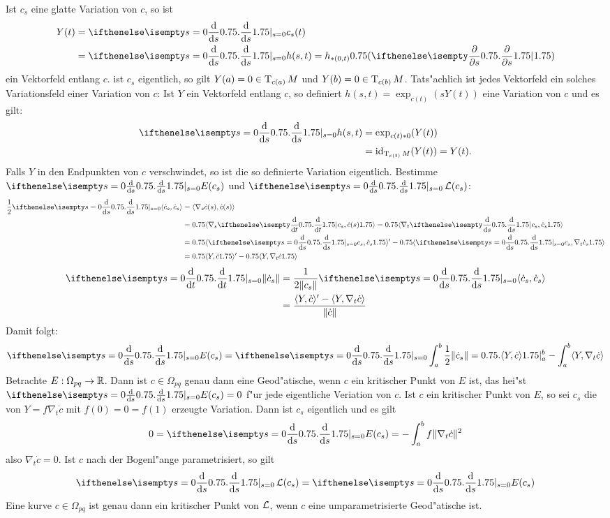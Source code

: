 Ist $c_s$ eine glatte Variation von $c$, so ist
\begin{align*}
	Y(t) &= \difffrac[s=0]{}{s} c_s(t)\\
	&= \difffrac[s=0]{}{s} h(s,t) = h_{*(0,t)}\left(\pdifffrac{}{s}\right)
\end{align*}
ein Vektorfeld entlang $c$. ist $c_s$ eigentlich, so gilt $Y(a) = 0 \in \operatorname{T}_{c(a)}M$ und $Y(b) = 0 \in \operatorname{T}_{c(b)}M$.
Tats"achlich ist jedes Vektorfeld ein solches Variationsfeld einer Variation von $c$: Ist $Y$ ein Vektorfeld entlang $c$, so definiert $h(s,t) = \exp_{c(t)}(s Y(t))$ eine Variation von $c$ und es gilt:
\begin{align*}
	\difffrac[s=0]{}{s} h(s,t) &= \exp_{c(t)*0}(Y(t))\\
	&= \id_{\T_{c(t)}M}(Y(t)) = Y(t).
\end{align*}
Falls $Y$ in den Endpunkten von $c$ verschwindet, so ist die so definierte Variation eigentlich. Bestimme $\difffrac[s=0]{}{s} E(c_s)$ und $\difffrac[s=0]{}{s}\calL(c_s)$:
\begin{align*}
	\frac{1}{2} \difffrac[s=0]{}{s} \langle \dot c_s, \dot c_s \rangle &= \langle \nabla_s \dot c(s), \dot c(s) \rangle\\
		&= \left\langle \nabla_s \difffrac{}{t} c_s, \dot c(s) \right\rangle = \left\langle \nabla_t \difffrac{}{s} c_s, \dot c_s \right\rangle \\
		&= \left\langle \difffrac[s=0]{}{s} c_s, \dot c_s \right\rangle' - \left\langle \difffrac[s=0]{}{s} c_s, \nabla_t \dot c_s \right\rangle \\
		&= \left\langle Y, \dot c \right\rangle' - \left\langle Y, \nabla_t \dot c \right\rangle\\
\end{align*}
\begin{align*}
	\difffrac[s=0]{}{t} \|\dot c_s\| &= \frac{1}{2 \|c_s\|} \difffrac[s=0]{}{s} \langle \dot c_s, \dot c_s \rangle\\
		&= \frac{\langle Y, \dot c \rangle' - \langle Y, \nabla_t \dot c \rangle}{\|\dot c\|}
\end{align*}
Damit folgt:
\begin{align*}
	\difffrac[s=0]{}{s} E(c_s) = \difffrac[s=0]{}{s} \int_a^b \frac{1}{2} \|\dot c_s\| = \left. \langle Y, \dot c \rangle \right|_a^b - \int_a^b \langle Y, \nabla_t \dot c \rangle
\end{align*}
Betrachte $E: \Omega_{pq} \to \operatorname{\mathbb{R}}$. Dann ist $c \in \Omega_{pq}$ genau dann eine Geod"atische, wenn $c$ ein kritischer Punkt von $E$ ist, das hei"st $\difffrac[s=0]{}{s}E(c_s) = 0$ f"ur jede eigentliche Veriation von $c$.
Ist $c$ ein kritischer Punkt von $E$, so sei $c_s$ die von $Y = f \nabla_t \dot c$ mit $f(0) = 0 = f(1)$ erzeugte Variation.
Dann ist $c_s$ eigentlich und es gilt
\begin{align*}
	0 = \difffrac[s=0]{}{s} E(c_s) = - \int_a^b f \|\nabla_t \dot c\|^2
\end{align*}
also $\nabla_t \dot c = 0$.
Ist $c$ nach der Bogenl"ange parametrisiert, so gilt
\begin{align*}
	\difffrac[s=0]{}{s} \calL(c_s) = \difffrac[s=0]{}{s} E(c_s)
\end{align*}
Eine kurve $c \in \Omega_{pq}$ ist genau dann ein kritischer Punkt von $\operatorname{\mathcal{L}}$, wenn $c$ eine umparametrisierte Geod"atische ist.